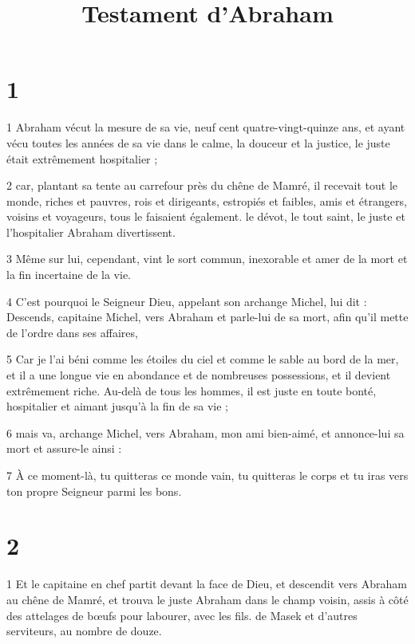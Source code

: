 

\title{Testament d'Abraham}


\chapter{1}

\par 1 Abraham vécut la mesure de sa vie, neuf cent quatre-vingt-quinze ans, et ayant vécu toutes les années de sa vie dans le calme, la douceur et la justice, le juste était extrêmement hospitalier ;

\par 2 car, plantant sa tente au carrefour près du chêne de Mamré, il recevait tout le monde, riches et pauvres, rois et dirigeants, estropiés et faibles, amis et étrangers, voisins et voyageurs, tous le faisaient également. le dévot, le tout saint, le juste et l'hospitalier Abraham divertissent.

\par 3 Même sur lui, cependant, vint le sort commun, inexorable et amer de la mort et la fin incertaine de la vie.

\par 4 C'est pourquoi le Seigneur Dieu, appelant son archange Michel, lui dit : Descends, capitaine Michel, vers Abraham et parle-lui de sa mort, afin qu'il mette de l'ordre dans ses affaires,

\par 5 Car je l'ai béni comme les étoiles du ciel et comme le sable au bord de la mer, et il a une longue vie en abondance et de nombreuses possessions, et il devient extrêmement riche. Au-delà de tous les hommes, il est juste en toute bonté, hospitalier et aimant jusqu'à la fin de sa vie ;

\par 6 mais va, archange Michel, vers Abraham, mon ami bien-aimé, et annonce-lui sa mort et assure-le ainsi :

\par 7 À ce moment-là, tu quitteras ce monde vain, tu quitteras le corps et tu iras vers ton propre Seigneur parmi les bons.

\chapter{2}

\par 1 Et le capitaine en chef partit devant la face de Dieu, et descendit vers Abraham au chêne de Mamré, et trouva le juste Abraham dans le champ voisin, assis à côté des attelages de bœufs pour labourer, avec les fils. de Masek et d'autres serviteurs, au nombre de douze.

